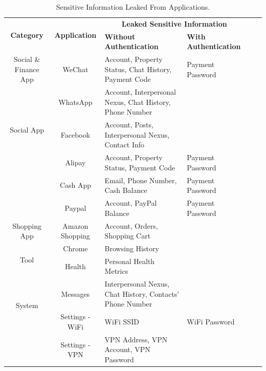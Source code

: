 \begin{table}[t]
	\centering
	\begin{tabular}{|c|c|l|l|c|c|}
		\hline
		\multirow{2}{*}{\textbf{Category} } & \multirow{2}{*}{ \textbf{Application} } & \multicolumn{2}{c|}{\textbf{Leaked Sensitive Information}} \\
															\cline{3-4}
											&				& \textbf{Without Authentication}						& \textbf{With Authentication} \\
		\hline
		Social \& Finance App 				& WeChat      & Account, Property Status, Chat History, Payment Code   		& Payment Password \\
		\hline
		\multirow{3}{*}{Social App}
							       			& WhatsApp    & Account, Interpersonal Nexus, Chat History, Phone Number    & \\
											\cline{2-4}
							       			& Facebook    & Account, Posts, Interpersonal Nexus, Contact Info           & \\
		\hline
		\multirow{3}{*}{Finance App}       	& Alipay      & Account, Property Status, Payment Code         				& Payment Password \\
											\cline{2-4}
											& Cash App    & Email, Phone Number, Cash Balance							& Payment Password \\
											\cline{2-4}
											& Paypal      & Account, PayPal Balance     								& Payment Password \\
		\hline
		\multirow{1}{*}{Shopping App}		& Amazon Shopping  & Account, Orders, Shopping Cart         				& \\
		\hline
		\multirow{2}{*}{Tool}               & Chrome      & Browsing History                                	& \\
											\cline{2-4}
		                					& Health      & Personal Health Metrics      						& \\
		\hline
		\multirow{2}{*}{System}             &  Messages   & Interpersonal Nexus, Chat History, Contacts' Phone Number &   \\
											\cline{2-4}
											& Settings - WiFi   & WiFi SSID                                	&  WiFi Password \\
											\cline{2-4}
		                					& Settings - VPN    & VPN Address, VPN Account, VPN Password      						& \\
		\hline
	\end{tabular}
	\linebreak
	\caption{Sensitive Information Leaked From Applications.}
	\label{table:information_extracted}
\end{table}



